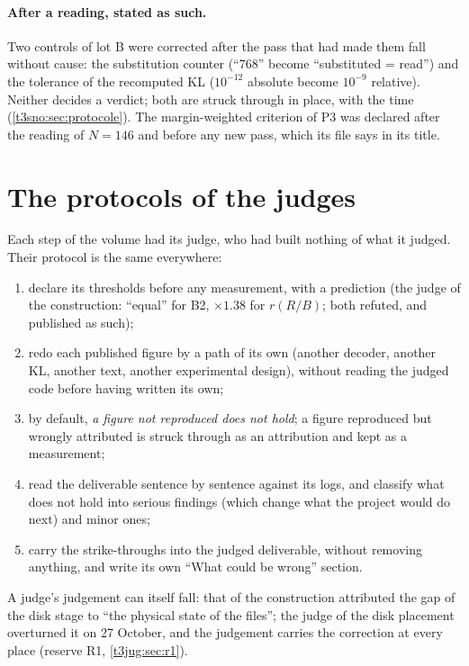 \paragraph{After a reading, stated as such.} Two controls of lot B were corrected after the pass that had made them fall without cause: the substitution counter (``768'' become ``substituted = read'') and the tolerance of the recomputed KL ($10^{-12}$ absolute become $10^{-9}$ relative). Neither decides a verdict; both are struck through in place, with the time (\cref{t3sno:sec:protocole}). The margin-weighted criterion of P3 was declared after the reading of $N = 146$ and before any new pass, which its file says in its title.

\section{The protocols of the judges}\label{t3ann:sec:juges}

Each step of the volume had its judge, who had built nothing of what it judged. Their protocol is the same everywhere:
\begin{enumerate}
\item declare its thresholds before any measurement, with a prediction (the judge of the construction: ``equal'' for B2, $\times 1.38$ for $r(R/B)$; both refuted, and published as such);
\item redo each published figure by a path of its own (another decoder, another KL, another text, another experimental design), without reading the judged code before having written its own;
\item by default, \emph{a figure not reproduced does not hold}; a figure reproduced but wrongly attributed is struck through as an attribution and kept as a measurement;
\item read the deliverable sentence by sentence against its logs, and classify what does not hold into serious findings (which change what the project would do next) and minor ones;
\item carry the strike-throughs into the judged deliverable, without removing anything, and write its own ``What could be wrong'' section.
\end{enumerate}
A judge's judgement can itself fall: that of the construction attributed the gap of the disk stage to ``the physical state of the files''; the judge of the disk placement overturned it on 27 October, and the judgement carries the correction at every place (reserve R1, \cref{t3jug:sec:r1}).

